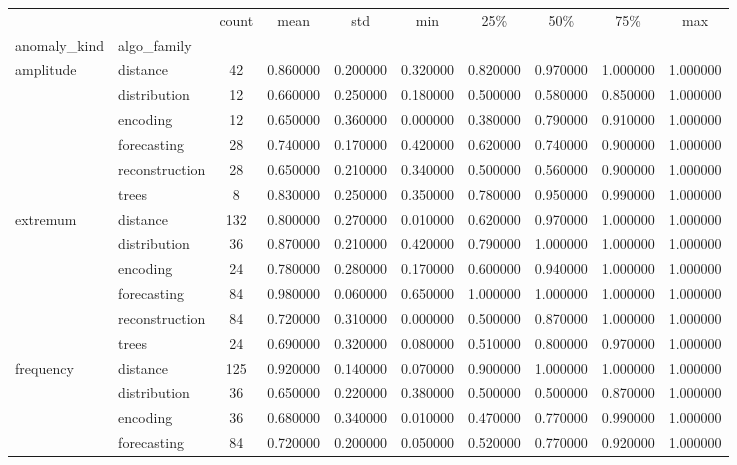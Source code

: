 \begin{tabular}{|l|l|c|c|c|c|c|c|c|c|}
\toprule
 &  & count & mean & std & min & 25\% & 50\% & 75\% & max \\
anomaly_kind & algo_family &  &  &  &  &  &  &  &  \\
\midrule
\multirow[t]{6}{*}{amplitude} & distance & 42 & 0.860000 & 0.200000 & 0.320000 & 0.820000 & 0.970000 & 1.000000 & 1.000000 \\
 & distribution & 12 & 0.660000 & 0.250000 & 0.180000 & 0.500000 & 0.580000 & 0.850000 & 1.000000 \\
 & encoding & 12 & 0.650000 & 0.360000 & 0.000000 & 0.380000 & 0.790000 & 0.910000 & 1.000000 \\
 & forecasting & 28 & 0.740000 & 0.170000 & 0.420000 & 0.620000 & 0.740000 & 0.900000 & 1.000000 \\
 & reconstruction & 28 & 0.650000 & 0.210000 & 0.340000 & 0.500000 & 0.560000 & 0.900000 & 1.000000 \\
 & trees & 8 & 0.830000 & 0.250000 & 0.350000 & 0.780000 & 0.950000 & 0.990000 & 1.000000 \\
\cline{1-10}
\multirow[t]{6}{*}{extremum} & distance & 132 & 0.800000 & 0.270000 & 0.010000 & 0.620000 & 0.970000 & 1.000000 & 1.000000 \\
 & distribution & 36 & 0.870000 & 0.210000 & 0.420000 & 0.790000 & 1.000000 & 1.000000 & 1.000000 \\
 & encoding & 24 & 0.780000 & 0.280000 & 0.170000 & 0.600000 & 0.940000 & 1.000000 & 1.000000 \\
 & forecasting & 84 & 0.980000 & 0.060000 & 0.650000 & 1.000000 & 1.000000 & 1.000000 & 1.000000 \\
 & reconstruction & 84 & 0.720000 & 0.310000 & 0.000000 & 0.500000 & 0.870000 & 1.000000 & 1.000000 \\
 & trees & 24 & 0.690000 & 0.320000 & 0.080000 & 0.510000 & 0.800000 & 0.970000 & 1.000000 \\
\cline{1-10}
\multirow[t]{6}{*}{frequency} & distance & 125 & 0.920000 & 0.140000 & 0.070000 & 0.900000 & 1.000000 & 1.000000 & 1.000000 \\
 & distribution & 36 & 0.650000 & 0.220000 & 0.380000 & 0.500000 & 0.500000 & 0.870000 & 1.000000 \\
 & encoding & 36 & 0.680000 & 0.340000 & 0.010000 & 0.470000 & 0.770000 & 0.990000 & 1.000000 \\
 & forecasting & 84 & 0.720000 & 0.200000 & 0.050000 & 0.520000 & 0.770000 & 0.920000 & 1.000000 \\

\end{tabular}
